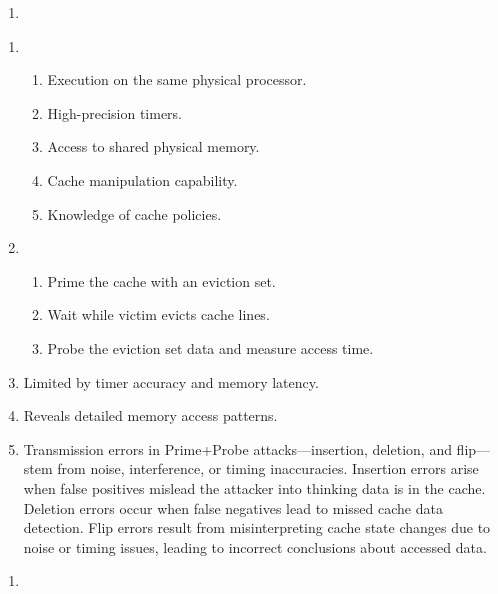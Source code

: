 \documentclass[sheet=2, prefix, english]{dexercise}
\begin{document}
\begin{enumerate}
  \item
\end{enumerate}


\begin{enumerate}
  \item
    \begin{enumerate}
      \item Execution on the same physical processor.
      \item High-precision timers.
      \item Access to shared physical memory.
      \item Cache manipulation capability.
      \item Knowledge of cache policies.
    \end{enumerate}
  \item
    \begin{enumerate}
      \item Prime the cache with an eviction set.
      \item Wait while victim evicts cache lines.
      \item Probe the eviction set data and measure access time.
    \end{enumerate}
  \item Limited by timer accuracy and memory latency.
  \item Reveals detailed memory access patterns.
  \item
    Transmission errors in Prime+Probe attacks—insertion, deletion, and
    flip—stem from noise, interference, or timing inaccuracies.
    Insertion errors arise when false positives mislead the attacker into
    thinking data is in the cache.
    Deletion errors occur when false negatives lead to missed cache data
    detection.
    Flip errors result from misinterpreting cache state changes due to noise or
    timing issues, leading to incorrect conclusions about accessed data.
\end{enumerate}


\begin{enumerate}
  \item
\end{enumerate}
\end{document}
